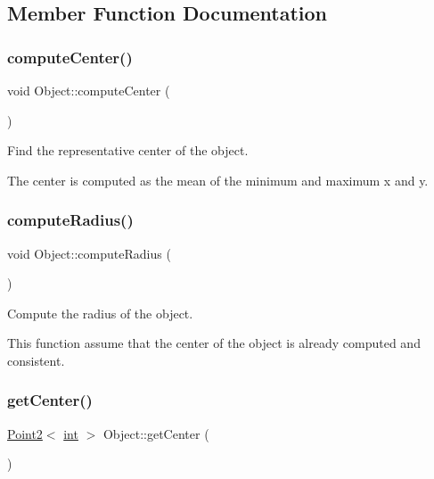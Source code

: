 \subsection{Member Function Documentation}
\mbox{\label{class_object_afc241f20b0055c8840f849d40d108359}} 
\subsubsection{\texorpdfstring{computeCenter()}{computeCenter()}}
{\footnotesize\ttfamily void Object\+::compute\+Center (\begin{DoxyParamCaption}{ }\end{DoxyParamCaption})}



Find the representative center of the object. 

The center is computed as the mean of the minimum and maximum x and y. \mbox{\label{class_object_a520dcca66f8a8075559b3a45a7a2d81a}} 
\subsubsection{\texorpdfstring{computeRadius()}{computeRadius()}}
{\footnotesize\ttfamily void Object\+::compute\+Radius (\begin{DoxyParamCaption}{ }\end{DoxyParamCaption})}



Compute the radius of the object. 

This function assume that the center of the object is already computed and consistent. \mbox{\label{class_object_aa624c3f9e2958743a0ae7efc78f5d586}} 
\subsubsection{\texorpdfstring{getCenter()}{getCenter()}}
{\footnotesize\ttfamily \mbox{\hyperlink{class_point2}{Point2}}$<$ \mbox{\hyperlink{draw_8hh_aa620a13339ac3a1177c86edc549fda9b}{int}} $>$ Object\+::get\+Center (\begin{DoxyParamCaption}{ }\end{DoxyParamCaption})}



